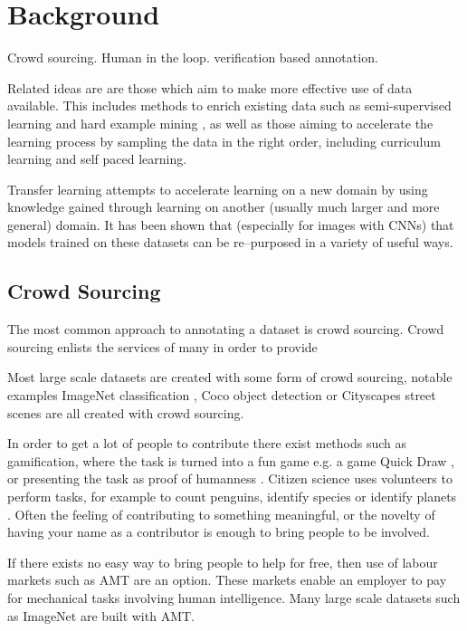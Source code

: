 \section {Background}

Crowd sourcing. Human in the loop. verification based annotation.



Related ideas are are those which aim to make more effective use of data available. This includes methods to enrich existing data such as semi-supervised learning and hard example mining \cite{Jin2018, Yu2018, Canevet2014}, as well as those aiming to accelerate the learning process by sampling the data in the right order, including curriculum learning and self paced learning.

Transfer learning attempts to accelerate learning on a new domain by using knowledge gained through learning on another (usually much larger and more general) domain. It has been shown that (especially for images with \gls{CNN}s) that models trained on these datasets can be re--purposed in a variety of useful ways.


\subsection {Crowd Sourcing}

The most common approach to annotating a dataset is crowd sourcing. Crowd sourcing enlists the services of many in order to provide 

Most large scale datasets are created with some form of crowd sourcing, notable examples ImageNet classification \cite{JiaDeng2009}, Coco object detection \cite{Lin2014} or Cityscapes street scenes \cite{Cordts2016} are all created with crowd sourcing. 

In order to get a lot of people to contribute there exist methods such as gamification, where the task is turned into a fun game  e.g. a game Quick Draw \cite{Ha2017}, or presenting the task as proof of humanness \cite{Goodfellow2013a}. Citizen science uses volunteers to perform tasks, for example to count penguins, identify species or identify planets \cite{Simpson2014, Masters2016}. Often the feeling of contributing to something meaningful, or the novelty of having your name as a contributor is enough to bring people to be involved.

If there exists no easy way to bring people to help for free, then use of labour markets such as \gls{AMT} are an option. These markets enable an employer to pay for mechanical tasks involving human intelligence. Many large scale datasets such as ImageNet \cite{Russakovsky2015} are built with \gls{AMT}. 


